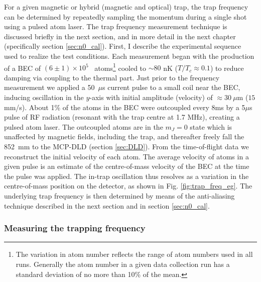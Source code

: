 	For a given magnetic or hybrid (magnetic and optical) trap, the trap frequency can be determined by repeatedly sampling the momentum during a single shot using a pulsed atom laser. 
	The trap frequency measurement technique is discussed briefly in the next section, and in more detail in the next chapter (specifically section \ref{sec:n0_cal}). 
	First, I describe the experimental sequence used to realize the test conditions.
	Each measurement began with the production of a BEC of $(6\pm1)\times10^5$ \mhe~atoms\footnote{The variation in atom number reflects the range of atom numbers used in all runs. Generally the atom number in a given data collection run has a standard deviation of no more than 10\% of the mean.} cooled to $\sim80$ nK ($T/T_c\approx 0.1$) to reduce damping via coupling to the thermal part.
	Just prior to the frequency measurement we applied a 50~$\mu$s current pulse to a small coil near the BEC, inducing oscillation in the $y$-axis with initial amplitude (velocity) of $\approx30~\mu$m ($15$ mm/s).
	About 1\% of the atoms in the BEC were outcoupled every 8ms by a 5$\mu$s pulse of RF radiation (resonant with the trap centre at 1.7 MHz), creating a pulsed atom laser.
	The outcoupled atoms are in the $m_J=0$ state which is unaffected by magnetic fields, including the trap, and thereafter freely fall the 852~mm to the MCP-DLD (section \ref{sec:DLD}).
	From the time-of-flight data we reconstruct the initial velocity of each atom.
	The average velocity of atoms in a given pulse is an estimate of the centre-of-mass velocity of the BEC at the time the pulse was applied.
	The in-trap oscillation thus resolves as a variation in the centre-of-mass position on the detector, as shown in Fig. \ref{fig:trap_freq_eg}.
	The underlying trap frequency is then determined by means of the anti-aliasing technique described in the next section and in section \ref{sec:n0_cal}.

\subsubsection{Measuring the trapping frequency}
	\label{sec:trap_freq_meas}

